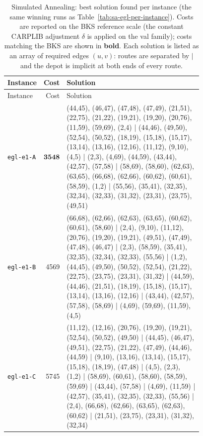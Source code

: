 \begin{landscape}
\begingroup\scriptsize
\begin{longtable}{lr>{\tiny\raggedright\arraybackslash}p{0.78\linewidth}}
\caption{Simulated Annealing: best solution found per instance (the same winning runs as Table~\ref{tab:sa-egl-per-instance}). Costs are reported on the BKS reference scale (the constant CARPLIB adjustment $\delta$ is applied on the val family); costs matching the BKS are shown in \textbf{bold}. Each solution is listed as an array of required edges $(u,v)$: routes are separated by $|$ and the depot is implicit at both ends of every route.}\label{tab:sa-egl-solutions}\\
\toprule
Instance & Cost & Solution \\
\midrule
\endfirsthead
\toprule
Instance & Cost & Solution \\
\midrule
\endhead
\bottomrule
\endfoot
\texttt{egl-e1-A} & $\mathbf{3548}$ & (44,45), (46,47), (47,48), (47,49), (21,51), (22,75), (21,22), (19,21), (19,20), (20,76), (11,59), (59,69), (2,4) | (44,46), (49,50), (52,54), (50,52), (18,19), (15,18), (15,17), (13,14), (13,16), (12,16), (11,12), (9,10), (4,5) | (2,3), (4,69), (44,59), (43,44), (42,57), (57,58) | (58,69), (58,60), (62,63), (63,65), (66,68), (62,66), (60,62), (60,61), (58,59), (1,2) | (55,56), (35,41), (32,35), (32,34), (32,33), (31,32), (23,31), (23,75), (49,51) \\[2pt]
\texttt{egl-e1-B} & 4569 & (66,68), (62,66), (62,63), (63,65), (60,62), (60,61), (58,60) | (2,4), (9,10), (11,12), (20,76), (19,20), (19,21), (49,51), (47,49), (47,48), (46,47) | (2,3), (58,59), (35,41), (32,35), (32,34), (32,33), (55,56) | (1,2), (44,45), (49,50), (50,52), (52,54), (21,22), (22,75), (23,75), (23,31), (31,32) | (44,59), (44,46), (21,51), (18,19), (15,18), (15,17), (13,14), (13,16), (12,16) | (43,44), (42,57), (57,58), (58,69) | (4,69), (59,69), (11,59), (4,5) \\[2pt]
\texttt{egl-e1-C} & 5745 & (11,12), (12,16), (20,76), (19,20), (19,21), (52,54), (50,52), (49,50) | (44,45), (46,47), (49,51), (22,75), (21,22), (47,49), (44,46), (44,59) | (9,10), (13,16), (13,14), (15,17), (15,18), (18,19), (47,48) | (4,5), (2,3), (1,2) | (58,69), (60,61), (58,60), (58,59), (59,69) | (43,44), (57,58) | (4,69), (11,59) | (42,57), (35,41), (32,35), (32,33), (55,56) | (2,4), (66,68), (62,66), (63,65), (62,63), (60,62) | (21,51), (23,75), (23,31), (31,32), (32,34) \\[2pt]

\end{longtable}
\end{landscape}
